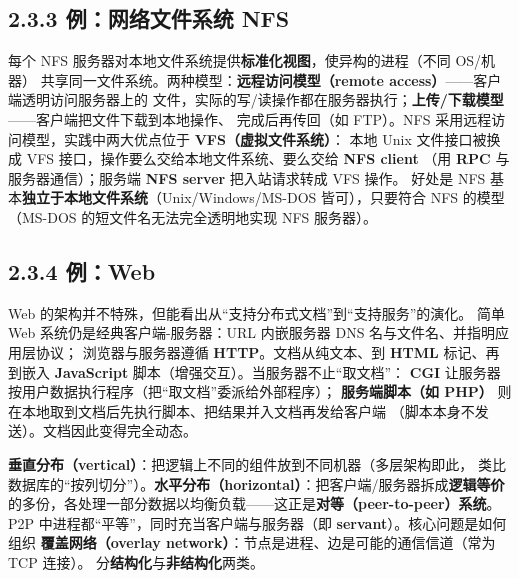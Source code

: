 \subsection*{2.3.3 例：网络文件系统 NFS}
每个 NFS 服务器对本地文件系统提供\textbf{标准化视图}，使异构的进程（不同 OS/机器）
共享同一文件系统。两种模型：\textbf{远程访问模型（remote access）}——客户端透明访问服务器上的
文件，实际的写/读操作都在服务器执行；\textbf{上传/下载模型}——客户端把文件下载到本地操作、
完成后再传回（如 FTP）。NFS 采用远程访问模型，实践中两大优点位于 \textbf{VFS（虚拟文件系统）}：
本地 Unix 文件接口被换成 VFS 接口，操作要么交给本地文件系统、要么交给 \textbf{NFS client}
（用 \textbf{RPC} 与服务器通信）；服务端 \textbf{NFS server} 把入站请求转成 VFS 操作。
好处是 NFS 基本\textbf{独立于本地文件系统}（Unix/Windows/MS-DOS 皆可），只要符合 NFS 的模型
（MS-DOS 的短文件名无法完全透明地实现 NFS 服务器）。

\begin{closeread}
\end{closeread}

\subsection*{2.3.4 例：Web}
Web 的架构并不特殊，但能看出从“支持分布式文档”到“支持服务”的演化。
简单 Web 系统仍是经典客户端-服务器：URL 内嵌服务器 DNS 名与文件名、并指明应用层协议；
浏览器与服务器遵循 \textbf{HTTP}。文档从纯文本、到 \textbf{HTML} 标记、再到嵌入
\textbf{JavaScript} 脚本（增强交互）。当服务器不止“取文档”：
\textbf{CGI} 让服务器按用户数据执行程序（把“取文档”委派给外部程序）；
\textbf{服务端脚本（如 PHP）} 则在本地取到文档后先执行脚本、把结果并入文档再发给客户端
（脚本本身不发送）。文档因此变得完全动态。



\textbf{垂直分布（vertical）}：把逻辑上不同的组件放到不同机器（多层架构即此，
类比数据库的“按列切分”）。\textbf{水平分布（horizontal）}：把客户端/服务器拆成\textbf{逻辑等价}
的多份，各处理一部分数据以均衡负载——这正是\textbf{对等（peer-to-peer）系统}。
P2P 中进程都“平等”，同时充当客户端与服务器（即 \textbf{servant}）。核心问题是如何组织
\textbf{覆盖网络（overlay network）}：节点是进程、边是可能的通信信道（常为 TCP 连接）。
分\textbf{结构化}与\textbf{非结构化}两类。

